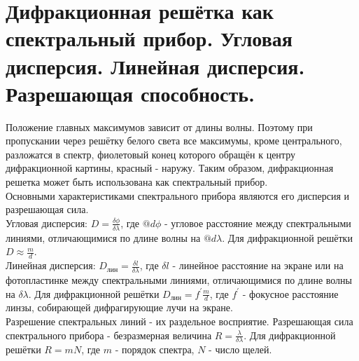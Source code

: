 \documentclass[14pt]{extarticle}
\begin{document}
\section{Дифракционная решётка как спектральный прибор. Угловая дисперсия. Линейная
дисперсия. Разрешающая способность.}
Положение главных максимумов зависит от длины волны. Поэтому при пропускании
через решётку белого света все максимумы, кроме центрального, 
разложатся в спектр, фиолетовый конец которого обращён к центру дифракционной 
картины, красный - наружу. Таким образом, дифракционная решетка может быть 
использована как спектральный прибор.\\
Основными характеристиками спектрального прибора являются его дисперсия и 
разрешающая сила.\\
Угловая дисперсия: $D = \frac{\delta \phi}{\delta \lambda}$, где
$@d \phi$ - угловое расстояние между спектральными линиями, отличающимися 
по длине волны на $@d \lambda$. Для дифракционной решётки 
$D \approx \frac{m}{d}$.\\
Линейная дисперсия: $D_{лин} = \frac{\delta l}{\delta \lambda}$, где 
$\delta l$ - линейное расстояние на экране или на фотопластинке между
спектральными линиями, отличающимися по длине волны на $\delta \lambda$. Для
дифракционной решётки $D_{лин} = f^{'} \frac{m}{d}$, где $f^{'}$ - 
фокусное расстояние линзы, собирающей дифрагирующие лучи на экране.\\
Разрешение спектральных линий - их раздельное восприятие. Разрешающая сила 
спектрального прибора - безразмерная величина 
$R = \frac{\lambda}{\delta \lambda}$. Для дифракционной решётки $R = mN$, где
$m$ - порядок спектра, $N$ - число щелей. 
\end{document}
